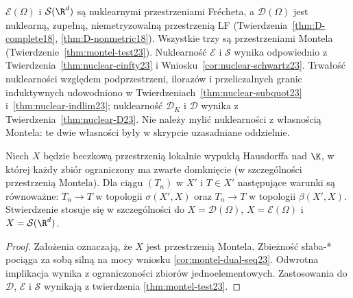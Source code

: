 \begin{uwaga}
\label{rem:tabela-struktur25}
$\mathcal E(\Omega)$ i $\mathcal S(\R^d)$ są nuklearnymi
przestrzeniami Frécheta, a $\mathcal D(\Omega)$ jest nuklearną,
zupełną, niemetryzowalną przestrzenią LF
(Twierdzenia~\ref{thm:D-complete18}, \ref{thm:D-nonmetric18}).
Wszystkie trzy są przestrzeniami Montela
(Twierdzenie~\ref{thm:montel-test23}).
Nuklearność $\mathcal E$ i $\mathcal S$ wynika odpowiednio
z Twierdzenia~\ref{thm:nuclear-cinfty23}
i Wniosku~\ref{cor:nuclear-schwartz23}.
Trwałość nuklearności względem podprzestrzeni, ilorazów
i przeliczalnych granic induktywnych udowodniono w
Twierdzeniach~\ref{thm:nuclear-subquot23} i~\ref{thm:nuclear-indlim23};
nuklearność $\mathcal D_K$ i $\mathcal D$ wynika z
Twierdzenia~\ref{thm:nuclear-D23}. Nie należy mylić nuklearności
z własnością Montela: te dwie własności były w skrypcie
uzasadniane oddzielnie.
\end{uwaga}
\begin{twierdzenie}
\label{thm:weak-strong-sequences25}
Niech $X$ będzie beczkową przestrzenią lokalnie wypukłą
Hausdorffa nad $\K$, w której każdy zbiór ograniczony
ma zwarte domknięcie (w szczególności przestrzenią Montela).
Dla ciągu $(T_n)$ w $X'$ i $T\in X'$ następujące
warunki są równoważne: $T_n\to T$ w topologii
$\sigma(X',X)$ oraz $T_n\to T$ w topologii $\beta(X',X)$.
Stwierdzenie stosuje się w szczególności do
$X=\mathcal D(\Omega)$, $X=\mathcal E(\Omega)$ i
$X=\mathcal S(\R^d)$.
\end{twierdzenie}
\begin{proof}
Założenia oznaczają, że $X$ jest przestrzenią Montela.
Zbieżność słaba-* pociąga za sobą silną na mocy wniosku
\ref{cor:montel-dual-seq23}. Odwrotna implikacja wynika
z ograniczoności zbiorów jednoelementowych.
Zastosowania do $\mathcal D$, $\mathcal E$ i $\mathcal S$
wynikają z twierdzenia \ref{thm:montel-test23}.
\end{proof}


